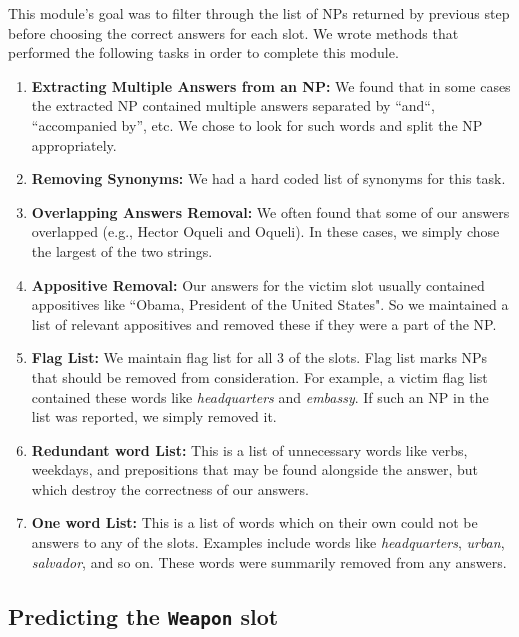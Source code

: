 \documentclass[11pt]{myclass}
\begin{document}
This module’s goal was to filter through the list of NPs returned by previous step before choosing the correct answers for each slot. We wrote methods that performed the following tasks in order to complete this module. 

\begin{enumerate}

\item \textbf{Extracting Multiple Answers from an NP:} We found that in some cases the extracted NP contained multiple answers separated by “and“, “accompanied by”, etc. We chose to look for such words and split the NP appropriately.

\item \textbf{Removing Synonyms:} We had a hard coded list of synonyms for this task. 

\item \textbf{Overlapping Answers Removal:} We often found that some of our answers overlapped (e.g., Hector Oqueli and Oqueli). In these cases, we simply chose the largest of the two strings.

\item \textbf{Appositive Removal:} Our answers for the victim slot usually contained appositives like ``Obama, President of the United States". So we maintained a list of relevant appositives and removed these if they were a part of the NP.

\item \textbf{Flag List:} We maintain flag list for all 3 of the slots. Flag list marks NPs that should be removed from consideration. For example, a victim flag list contained these words like \textit{headquarters} and \textit{embassy}. If such an NP in the list was reported, we simply removed it.

\item \textbf{Redundant word List:} This is a list of unnecessary words like verbs, weekdays, and prepositions that may be found alongside the answer, but which destroy the correctness of our answers.

\item \textbf{One word List:} This is a list of words which on their own could not be answers to any of the slots. Examples include words like \textit{headquarters}, \textit{urban}, \textit{salvador}, and so on. These words were summarily removed from any answers.

\end{enumerate}

\subsection{Predicting the \texttt{Weapon} slot}
\end{document}
